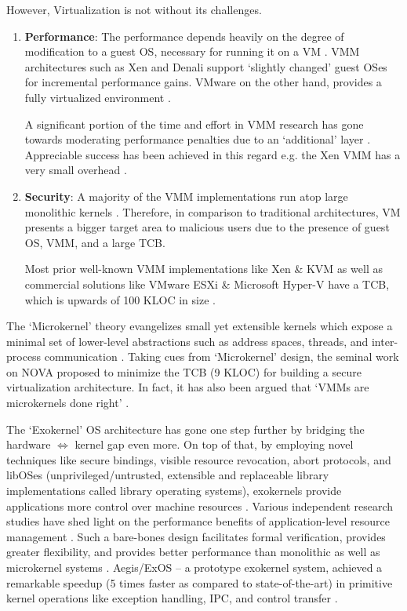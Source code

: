 However, Virtualization is not without its challenges.
\begin{enumerate}
\item \textbf{Performance}: The performance depends heavily on the degree of modification to a guest OS, necessary for running it on a VM \cite{nova}. VMM architectures such as Xen \cite{barham2003xen} and Denali \cite{whitaker2002scale} support `slightly changed' guest OSes for incremental performance gains. VMware on the other hand, provides a fully virtualized environment \cite{vmmmk}.

A significant portion of the time and effort in VMM research has gone towards moderating performance penalties due to an `additional' layer \cite{vmmmk}. Appreciable success has been achieved in this regard e.g. the Xen VMM has a very small overhead \cite{vmmmk}. 

\item \textbf{Security}: A majority of the VMM implementations run atop large monolithic kernels \cite{nova}. Therefore, in comparison to traditional architectures, VM presents a bigger target area to malicious users due to the presence of guest OS, VMM, and a large TCB.

Most prior well-known VMM implementations like Xen \cite{barham2003xen} \& KVM \cite{kivity2007kvm} as well as commercial solutions like VMware ESXi \& Microsoft Hyper-V have a TCB, which is upwards of 100 KLOC in size \cite{nova}.
\end{enumerate}

The `Microkernel' theory evangelizes small yet extensible kernels which expose a minimal set of lower-level abstractions such as address spaces, threads, and inter-process communication \cite{liedtke1995micro}. Taking cues from `Microkernel' design, the seminal work on NOVA \cite{nova} proposed to minimize the TCB (9 KLOC) for building a secure virtualization architecture. In fact, it has also been argued that `VMMs are microkernels done right' \cite{vmmmk}.  

The `Exokernel' OS architecture has gone one step further by bridging the hardware $\Longleftrightarrow$ kernel gap even more. On top of that, by employing novel techniques like secure bindings, visible resource revocation, abort protocols, and libOSes (unprivileged/untrusted, extensible and replaceable library implementations called library operating systems), exokernels provide applications more control over machine resources \cite{engler1995exokernel}. Various independent research studies have shed light on the performance benefits of application-level resource management \cite{harty1992application} \cite{cao1994implementation} \cite{krueger1993tools} \cite{thekkath1994hardware}. Such a bare-bones design facilitates formal verification, provides greater flexibility, and provides better performance than monolithic as well as microkernel systems \cite{engler1995exokernel}. Aegis/ExOS -- a prototype exokernel system, achieved a remarkable speedup (5 times faster as compared to state-of-the-art) in primitive kernel operations like exception handling, IPC, and control transfer \cite{engler1995exokernel}.

